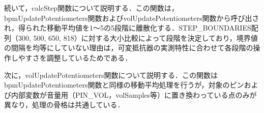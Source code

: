 % 
% 

続いて，calcStep関数について説明する．この関数は，bpmUpdatePotentiometers関数およびvolUpdatePotentiometers関数から呼び出され，得られた移動平均値を1〜5の5段階に離散化する．STEP\_BOUNDARIES配列（300, 500, 650, 818）に対する大小比較によって段階を決定しており，境界値の間隔を均等にしていない理由は，可変抵抗器の実測特性に合わせて各段階の操作しやすさを調整しているためである．


次に，volUpdatePotentiometers関数について説明する．この関数はbpmUpdatePotentiometers関数と同様の移動平均処理を行うが，対象のピンおよび内部変数が音量用（PIN\_VOL，volSamples等）に置き換わっている点のみが異なり，処理の骨格は共通している．

% 
% 

